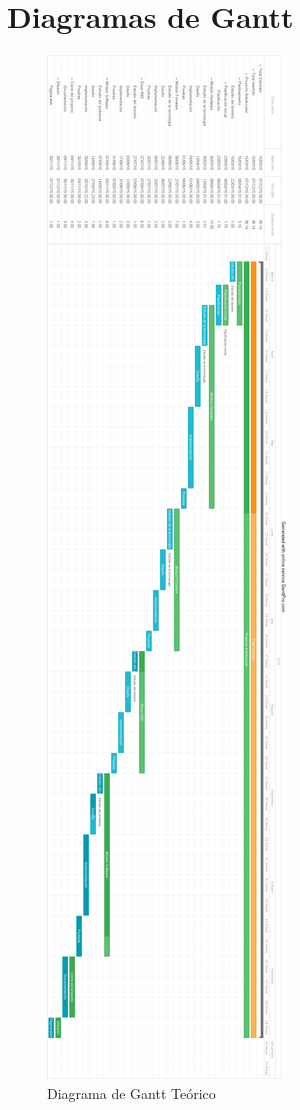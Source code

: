 \chapter{Diagramas de Gantt}
\label{gantt}



\begin{figure}[h]
\centering
\includegraphics[width=0.41\linewidth]{../images/gantt_inicial}
\caption{Diagrama de Gantt Teórico}
\label{gantt_inicial}
\end{figure}




